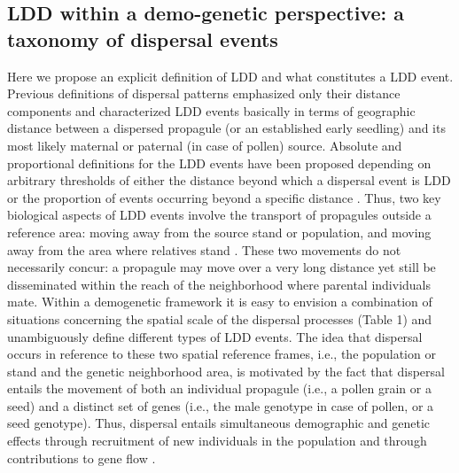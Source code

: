 \documentclass[a4paper, 12pt]{article}
\begin{document}
\begin{linenumbers}
\subsection*{LDD within a demo-genetic perspective: a taxonomy of dispersal events}

Here we propose an explicit definition of LDD and what constitutes a LDD event. Previous definitions of dispersal patterns emphasized only their distance components and characterized LDD events basically in terms of geographic distance between a dispersed propagule (or an established early seedling) and its most likely maternal or paternal (in case of pollen) source. Absolute and proportional definitions for the LDD events have been proposed depending on arbitrary thresholds of either the distance beyond which a dispersal event is LDD or the proportion of events occurring beyond a specific distance \citep{Nathan:2005jc, Nathan:2008is}. Thus, two key biological aspects of LDD events involve the transport of propagules outside a reference area: moving away from the source stand or population, and moving away from the area where relatives stand \citep{Kinlan:2005fb}. These two movements do not necessarily concur: a propagule may move over a very long distance yet still be disseminated within the reach of the neighborhood where parental individuals mate. Within a demogenetic framework it is easy to envision a combination of situations concerning the spatial scale of the dispersal processes (Table 1) and unambiguously define different types of LDD events. The idea that dispersal occurs in reference to these two spatial reference frames, i.e., the population or stand and the genetic neighborhood area, is motivated by the fact that dispersal entails the movement of both an individual propagule (i.e., a pollen grain or a seed) and a distinct set of genes (i.e., the male genotype in case of pollen, or a seed genotype). Thus, dispersal entails simultaneous demographic and genetic effects through recruitment of new individuals in the population and through contributions to gene flow \citep{Harper:1977aa}. 


\end{linenumbers}
\end{document}
